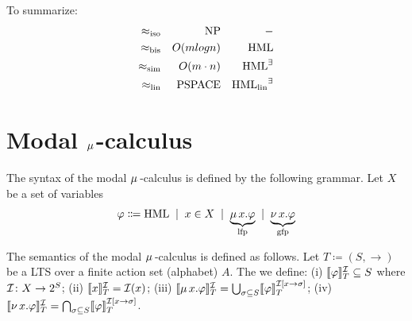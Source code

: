 
\begin{remark}
    To summarize:
    \begin{align*}
        \approx_{\mathrm{iso}} &&  \mathrm{NP} && -\\
        \approx_{\mathrm{bis}} && O(m log n) && \operatorname{HML}\\
        \approx_{\mathrm{sim}} && O(m \cdot n) && \operatorname{HML}^{\exists}\\
         \approx_{\mathrm{lin}} && \mathrm{PSPACE} && \operatorname{HML_{\mathrm{lin}}}^{\exists}\\
    \end{align*}
\end{remark}

\section{Modal $\mu\,$-calculus}

\begin{definition}
    The syntax of the modal $\mu\,$-calculus is defined by the following grammar. Let $X$ be a set of variables
    \begin{align*}
        \varphi \Coloneqq \operatorname{HML} \; \mid \;  x \in X \; \mid \; \underbrace{ \mu\, x. \varphi}_{\mathrm{lfp}} \; \mid \;  \underbrace{\nu\, x. \varphi}_{\mathrm{gfp}}
    \end{align*}
\end{definition}

\begin{definition}
    The semantics of the modal $\mu\,$-calculus is defined as follows.
    Let $T\coloneqq (S,\to)$ be a LTS over a finite action set (alphabet) $A$.
    The we define: (i) $ \llbracket \varphi \rrbracket_T^{\mathcal{I}} \subseteq S$ where $\mathcal{I} \colon X \to 2^S$; 
    (ii) $\llbracket x \rrbracket_T^{\mathcal{I}}  = \mathcal{I}(x)$; 
    (iii)  $\llbracket \mu\, x. \varphi \rrbracket_T^{\mathcal{I}}  = \bigcup_{\sigma \subseteq S} \llbracket \varphi \rrbracket_T^{\mathcal{I}[x \to \sigma]}$; (iv) $\llbracket \nu\, x. \varphi \rrbracket_T^{\mathcal{I}}  = \bigcap_{\sigma \subseteq S} \llbracket \varphi \rrbracket_T^{\mathcal{I}[x \to \sigma]}$.
\end{definition}

